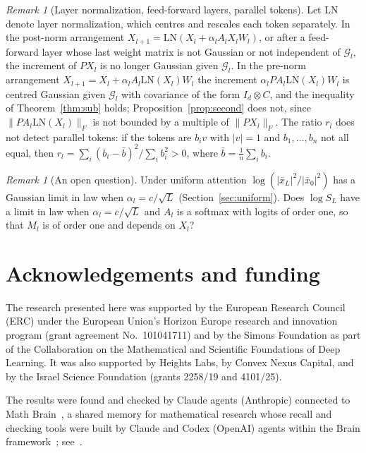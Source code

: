 \documentclass[11pt]{amsart}
\theoremstyle{definition}
\theoremstyle{remark}
\newtheorem{remark}[theorem]{Remark}
\numberwithin{equation}{section}
\newcommand{\cG}{\mathcal{G}}
\begin{document}
\begin{remark}[Layer normalization, feed-forward layers, parallel tokens]\label{rem:limits}
Let $\mathrm{LN}$ denote layer normalization, which centres and rescales each token separately. In the post-norm arrangement $X_{l+1}=\mathrm{LN}(X_l+\alpha_lA_lX_lW_l)$, or after a feed-forward layer whose last weight matrix is not Gaussian or not independent of $\cG_l$, the increment of $PX_l$ is no longer Gaussian given $\cG_l$. In the pre-norm arrangement $X_{l+1}=X_l+\alpha_lA_l\mathrm{LN}(X_l)W_l$ the increment $\alpha_lPA_l\mathrm{LN}(X_l)W_l$ is centred Gaussian given $\cG_l$ with covariance of the form $I_d\otimes C$, and the inequality of Theorem~\ref{thm:sub} holds; Proposition~\ref{prop:second} does not, since $\|PA_l\mathrm{LN}(X_l)\|_F$ is not bounded by a multiple of $\|PX_l\|_F$. The ratio $r_l$ does not detect parallel tokens: if the tokens are $b_iv$ with $|v|=1$ and $b_1,\dots,b_n$ not all equal, then $r_l=\sum_i(b_i-\bar b)^2/\sum_ib_i^2>0$, where $\bar b=\frac1n\sum_ib_i$.
\end{remark}

\begin{remark}[An open question]\label{rem:open}
Under uniform attention $\log(|\bar x_L|^2/|\bar x_0|^2)$ has a Gaussian limit in law when $\alpha_l=c/\sqrt L$ (Section~\ref{sec:uniform}). Does $\log S_L$ have a limit in law when $\alpha_l=c/\sqrt L$ and $A_l$ is a softmax with logits of order one, so that $M_l$ is of order one and depends on $X_l$?
\end{remark}

\section*{Acknowledgements and funding}
The research presented here was supported by the European Research Council (ERC) under the European Union's Horizon Europe research and innovation program (grant agreement No.~101041711) and by the Simons Foundation as part of the Collaboration on the Mathematical and Scientific Foundations of Deep Learning. It was also supported by Heights Labs, by Convex Nexus Capital, and by the Israel Science Foundation (grants 2258/19 and 4101/25).

The results were found and checked by Claude agents (Anthropic) connected to Math Brain~\cite{MathBrainRepo}, a shared memory for mathematical research whose recall and checking tools were built by Claude and Codex (OpenAI) agents within the Brain framework~\cite{BrainFramework}; see~\cite{MathBrainPaper}.
\end{document}
